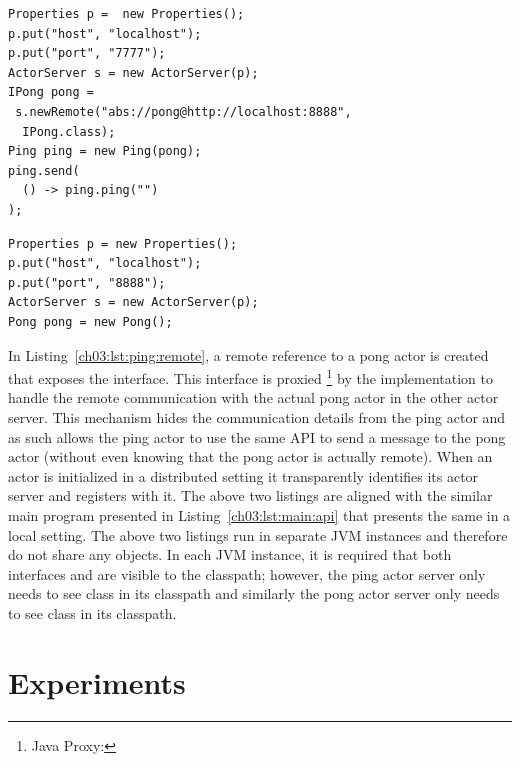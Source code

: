 \begin{center}
\begin{minipage}[t]{0.48\textwidth}
\begin{lstlisting}[caption=Remote ping actor main,label=lst:ping:remote]
Properties p =  new Properties();
p.put("host", "localhost");
p.put("port", "7777");
ActorServer s = new ActorServer(p);
IPong pong = 
 s.newRemote("abs://pong@http://localhost:8888",
  IPong.class);
Ping ping = new Ping(pong);
ping.send(
  () -> ping.ping("")
);
\end{lstlisting}
\end{minipage}
\hfill
\begin{minipage}[t]{0.48\textwidth}
\begin{lstlisting}[caption=Remote pong actor main,label=lst:pong:remote]
Properties p = new Properties();
p.put("host", "localhost");
p.put("port", "8888");
ActorServer s = new ActorServer(p);
Pong pong = new Pong();
\end{lstlisting}
\end{minipage}
\end{center}

In Listing~\ref{ch03:lst:ping:remote}, a remote reference to a pong actor is created that exposes the  interface.
This interface is proxied
\footnote{Java Proxy: } by the implementation 
to handle the remote communication with the actual pong actor in the other actor server.
This mechanism hides the communication details from the ping actor and as such allows the ping actor to use 
the same API to send a message to the pong actor (without even  knowing that the pong actor is actually remote).
When an actor is initialized in a distributed setting it transparently identifies its actor server and registers with it.
The above two listings are aligned with the similar main program presented in Listing~\ref{ch03:lst:main:api} that presents the same in a local setting.
The above two listings run in separate JVM instances and therefore do not share any objects.
In each JVM instance, it is required that both interfaces  and  are visible to the classpath; however, 
the ping actor server only needs to see  class in its classpath and similarly the pong actor server only needs 
to see  class in its classpath.

\section{Experiments}
\label{ch03:sec:experiments}

